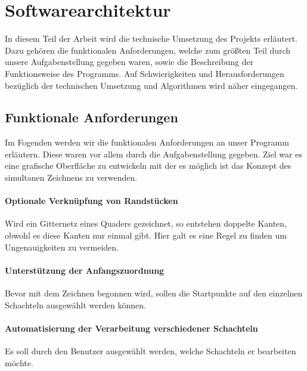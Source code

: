 \section{Softwarearchitektur}
\label{sec:backend}

In diesem Teil der Arbeit wird die technische Umsetzung des Projekts erläutert. Dazu gehören die funktionalen Anforderungen, welche zum größten Teil durch unsere Aufgabenstellung gegeben waren, sowie die Beschreibung der Funktionsweise des Programms. Auf Schwierigkeiten und Herausforderungen bezüglich der technischen Umsetzung und Algorithmen wird näher eingegangen.\\


\subsection{Funktionale Anforderungen}
\label{subsec:anforderungen}

Im Fogenden werden wir die funktionalen Anforderungen an unser Programm erläutern. Diese waren vor allem durch die Aufgabenstellung gegeben. Ziel war es eine grafische Oberfläche zu entwickeln mit der es möglich ist das Konzept des simultanen Zeichnens zu verwenden.

\paragraph{Optionale Verknüpfung von Randstücken}
Wird ein Gitternetz eines Quaders gezeichnet, so entstehen doppelte Kanten, obwohl es diese Kanten nur einmal gibt. Hier galt es eine Regel zu finden um Ungenauigkeiten zu vermeiden.

\paragraph{Unterstützung der Anfangszuordnung}
Bevor mit dem Zeichnen begonnen wird, sollen die Startpunkte auf den einzelnen Schachteln ausgewählt werden können.

\paragraph{Automatisierung der Verarbeitung verschiedener Schachteln}
Es soll durch den Benutzer ausgewählt werden, welche Schachteln er bearbeiten möchte.


